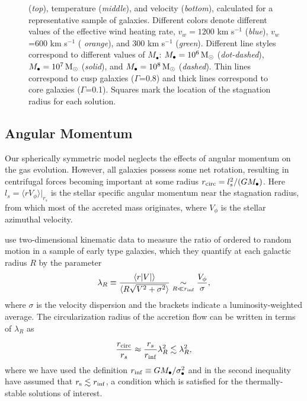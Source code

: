 \documentclass[usenatbib,fleqn]{mn2e}
\newcommand{\Mbh}[1][]{M_{\bullet#1}}
\newcommand{\vwO}{v_{w}}
\begin{document}
\begin{figure}
{    ({\it top}), temperature ({\it middle}), and velocity ({\it bottom}),
    calculated for a representative sample of galaxies.  Different colors
    denote different values of the effective wind heating rate,
    $\vwO=1200$ km s$^{-1}$ ({\it blue}), $\vwO$=600 km s$^{-1}$ ({\it
      orange}), and 300 km s$^{-1}$ ({\it green}).  Different
    line styles correspond to different values of $\Mbh$: $\Mbh=10^6
    \Msun$ ({\it dot-dashed}), $\Mbh=10^7 \Msun$ ({\it solid}), and
    $\Mbh=10^8 \Msun$ ({\it dashed}). Thin lines correspond to cusp
    galaxies ($\Gamma$=0.8) and thick lines correspond to core
    galaxies ($\Gamma$=0.1). Squares mark the location of
    the stagnation radius for each solution.
 }
\end{figure}

  \subsection{Angular Momentum}
  \label{sec:rotation}

  Our spherically symmetric model neglects the effects of angular
  momentum on the gas evolution.  However, all galaxies possess some
  net rotation, resulting in centrifugal forces becoming important at
  some radius $r_{\rm circ} = l^{2}_{s}/(GM_{\bullet})$.  Here
  $l_{s} = \langle r V_{\phi}\rangle |_{r_s}$ is the stellar
  specific angular momentum near the stagnation radius, from which
  most of the accreted mass originates, where $V_{\phi}$ is the
  stellar azimuthal velocity.

  \citet{EmsellemCappellari+:2007a} use two-dimensional kinematic data
  to measure the ratio of ordered to random motion in a sample of
  early type galaxies, which they quantify at each galactic radius $R$
  by the parameter
  \begin{align}
    \lambda_R \equiv \frac{\langle r|V|\rangle}{\langle R\sqrt{V^2+\sigma^2}\rangle} \underset{R \ll r_{\rm inf}}\sim \frac{V_{\phi}}{\sigma},
  \end{align}
  where $\sigma$ is the velocity dispersion and the brackets indicate
  a luminosity-weighted average.  The circularization radius of the
  accretion flow can be written in terms of $\lambda_R$ as

\begin{equation}
\frac{r_{\rm circ}}{r_{s}} \approx \frac{r_{s}}{r_{\rm inf}}\lambda_{R}^{2} \lesssim \lambda_{R}^{2},
\label{eq:rcirc}
\end{equation}
where we have used the definition $r_{\rm inf} \equiv
GM_{\bullet}/\sigma_{\bullet}^{2}$ and in the second inequality have assumed
that $r_{\rm s} \lesssim r_{\rm inf}$, a condition which is satisfied
for the thermally-stable solutions of interest.
\end{document}
